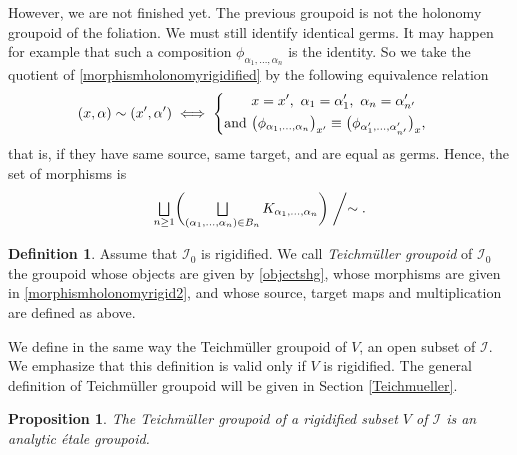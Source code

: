 \documentclass[JEP,XML,SOM,Unicode]{cedram}
\let\mathcal\mathscr
\let\oldbigsqcup\bigsqcup
\renewcommand{\bigsqcup}{\mathop{\textstyle\oldbigsqcup}\displaylimits}
\theoremstyle{plain}
\newtheorem{proposition}[theorem]{Proposition}
\theoremstyle{definition}
\newtheorem{definition}[theorem]{Definition}
\theoremstyle{remark}
\numberwithin{equation}{section}
\newcommand{\cI}{\mathcal{I}}
\let\uniondisjointe\bigsqcup
\begin{document}
However, we are not finished yet. The previous groupoid is not the holonomy groupoid of the foliation. We must still identify identical germs. It may happen for example that such a composition $\phi_{\alpha_1,\hdots,\alpha_n}$ is the identity. So we take the quotient of \eqref{morphismholonomyrigidified} by the following equivalence relation
\begin{equation}
\label{equivrigid}
(x,\alpha)\sim (x',\alpha')\iff
\left\{
\begin{aligned}
&x=x',\ \alpha_1=\alpha'_1,\ \alpha_n=\alpha'_{n'}\cr
\text{and }&\big (\phi_{\alpha_1,\hdots,\alpha_n}\big )_{x'}\equiv \big (\phi_{\alpha'_1,\hdots,\alpha'_{n'}}\big )_x,
\end{aligned}
\right .
\end{equation}
that is, if they have same source, same target, and are equal as germs.
Hence, the set of morphisms is
\begin{equation}
\label{morphismholonomyrigid2}
\uniondisjointe_{n\geq 1}\biggl (\uniondisjointe_{(\alpha_1,\hdots,\alpha_n) \in B_{n}} K_{\alpha_1,\hdots,\alpha_n}\biggr )\biggm /\sim.
\end{equation}

\begin{definition}
\label{teichrigid}
Assume that $\cI_0$ is rigidified. We call \emph{Teichmüller groupoid} of $\cI_0$ the groupoid whose objects are given by \eqref{objectshg}, whose morphisms are given in \eqref{morphismholonomyrigid2}, and whose source, target maps and multiplication are defined as above.
\end{definition}
We define in the same way the Teichmüller groupoid of $V$, an open subset of $\cI$. We emphasize that this definition is valid only if $V$ is rigidified. The general definition of Teichmüller groupoid will be given in Section \ref{Teichmueller}.

\begin{proposition}
\label{groupoidrigid}
The Teichmüller groupoid of a rigidified subset $V$ of $\cI$ is an analytic étale groupoid.
\end{proposition}
\end{document}
